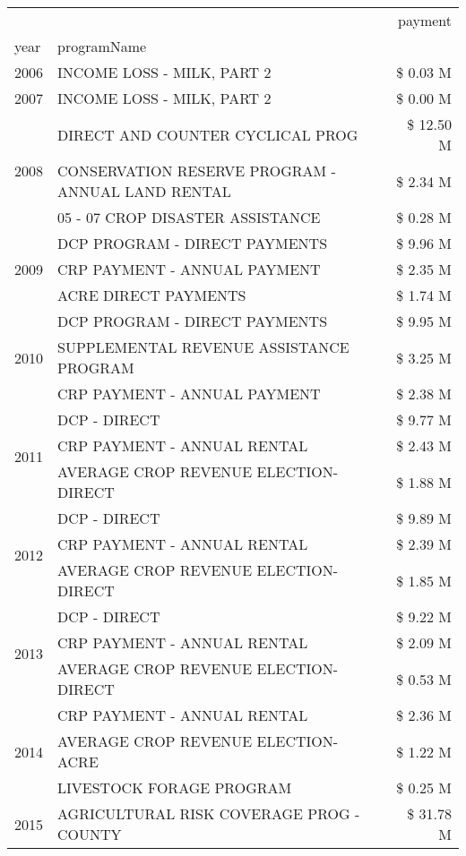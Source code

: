 \begin{tabular}{llr}
\toprule
 &  & payment \\
year & programName &  \\
\midrule
2006 & INCOME LOSS - MILK, PART 2 & \$ 0.03 M \\
\cline{1-3}
2007 & INCOME LOSS - MILK, PART 2 & \$ 0.00 M \\
\cline{1-3}
\multirow[t]{3}{*}{2008} & DIRECT AND COUNTER CYCLICAL PROG & \$ 12.50 M \\
 & CONSERVATION RESERVE PROGRAM - ANNUAL LAND RENTAL & \$ 2.34 M \\
 & 05 - 07 CROP DISASTER ASSISTANCE & \$ 0.28 M \\
\cline{1-3}
\multirow[t]{3}{*}{2009} & DCP PROGRAM - DIRECT PAYMENTS & \$ 9.96 M \\
 & CRP PAYMENT - ANNUAL PAYMENT & \$ 2.35 M \\
 & ACRE DIRECT PAYMENTS & \$ 1.74 M \\
\cline{1-3}
\multirow[t]{3}{*}{2010} & DCP PROGRAM - DIRECT PAYMENTS & \$ 9.95 M \\
 & SUPPLEMENTAL REVENUE ASSISTANCE PROGRAM & \$ 3.25 M \\
 & CRP PAYMENT - ANNUAL PAYMENT & \$ 2.38 M \\
\cline{1-3}
\multirow[t]{3}{*}{2011} & DCP - DIRECT & \$ 9.77 M \\
 & CRP PAYMENT - ANNUAL RENTAL & \$ 2.43 M \\
 & AVERAGE CROP REVENUE ELECTION-DIRECT & \$ 1.88 M \\
\cline{1-3}
\multirow[t]{3}{*}{2012} & DCP - DIRECT & \$ 9.89 M \\
 & CRP PAYMENT - ANNUAL RENTAL & \$ 2.39 M \\
 & AVERAGE CROP REVENUE ELECTION-DIRECT & \$ 1.85 M \\
\cline{1-3}
\multirow[t]{3}{*}{2013} & DCP - DIRECT & \$ 9.22 M \\
 & CRP PAYMENT - ANNUAL RENTAL & \$ 2.09 M \\
 & AVERAGE CROP REVENUE ELECTION-DIRECT & \$ 0.53 M \\
\cline{1-3}
\multirow[t]{3}{*}{2014} & CRP PAYMENT - ANNUAL RENTAL & \$ 2.36 M \\
 & AVERAGE CROP REVENUE ELECTION-ACRE & \$ 1.22 M \\
 & LIVESTOCK FORAGE PROGRAM & \$ 0.25 M \\
\cline{1-3}
\multirow[t]{3}{*}{2015} & AGRICULTURAL RISK COVERAGE PROG - COUNTY & \$ 31.78 M \\

\end{tabular}

